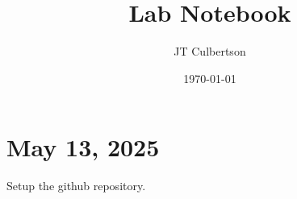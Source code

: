 \documentclass[12pt]{article}
\title{Lab Notebook}
\author{JT Culbertson}
\date{\today}
\begin{document}
\maketitle
\newpage

\section{May 13, 2025}
Setup the github repository.
\end{document}
